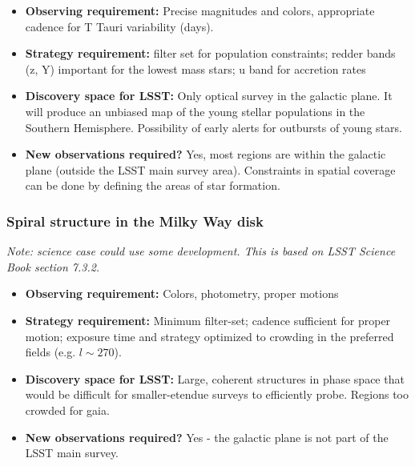 \begin{itemize}
\item {\bf Observing requirement:} Precise magnitudes and colors, appropriate cadence for T Tauri variability (days).

\vspace{-2mm}

\item {\bf Strategy requirement:} filter set for population constraints; redder bands (z, Y) important for the lowest mass stars; u band for accretion rates
\vspace{-2mm}

\item {\bf Discovery space for LSST:} Only optical survey in the galactic plane. It will produce an unbiased map of the young stellar populations in the Southern Hemisphere. Possibility of early alerts for outbursts of young stars.
\vspace{-2mm}

\item {\bf New observations required?} Yes, most regions are within the galactic plane (outside the LSST main survey area). Constraints in spatial coverage can be done by defining the areas of star formation.
\vspace{-2mm}
\end{itemize}

\subsubsection{Spiral structure in the Milky Way disk}

{\it Note: science case could use some development. This is based on LSST Science Book section 7.3.2.}

\begin{itemize}
\item {\bf Observing requirement:} Colors, photometry, proper motions
\vspace{-2mm}

\item {\bf Strategy requirement:} Minimum filter-set; cadence sufficient for proper motion; exposure time and strategy optimized to crowding in the preferred fields (e.g. $l \sim 270$).
\vspace{-2mm}

\item {\bf Discovery space for LSST:} Large, coherent structures in phase space that would be difficult for smaller-etendue surveys to efficiently probe. Regions too crowded for gaia.
\vspace{-2mm}

\item {\bf New observations required?} Yes - the galactic plane is not part of the LSST main survey.
\vspace{-2mm}
\end{itemize}



